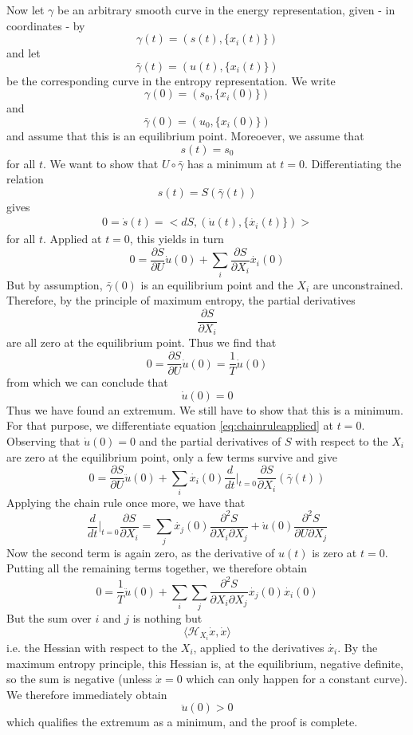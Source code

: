 \documentclass[a4paper, draft]{report}
\numberwithin{section}{chapter}
\numberwithin{equation}{chapter}
\theoremstyle{own}
\theoremstyle{remark}
\begin{document}
Now let $\gamma$ be an arbitrary smooth curve in the energy representation, given - in coordinates - by
$$
\gamma(t) = (s(t), \{ x_i(t) \})
$$
and let 
$$
\bar{\gamma}(t) = (u(t), \{ x_i(t) \})
$$
be the corresponding curve in the entropy representation. We write
$$
\gamma(0) = (s_0,\{ x_i(0) \} )
$$
and
$$
\bar{\gamma}(0) = (u_0, \{ x_i(0) \})
$$
and assume that this is an equilibrium point. Moreoever, we assume that
$$
s(t) = s_0
$$
for all $t$. We want to show that $U \circ \bar{\gamma}$ has a minimum at $t  = 0$. Differentiating the relation
$$
s(t) = S(\bar{\gamma}(t))
$$
gives 
\begin{align}
\label{eq:chainruleapplied}
0 = \dot{s}(t) = <dS, (\dot{u}(t), \{ \dot{x_i}(t)\})>
\end{align}
for all $t$. Applied at $t = 0$, this yields in turn
$$
0 = \frac{\partial S}{\partial U} \dot{u}(0) + 
\sum_i \frac{\partial S}{\partial X_i} \dot{x_i}(0)
$$
But by assumption, $\bar{\gamma}(0)$ is an equilibrium point and the $X_i$ are unconstrained. Therefore, by the principle of maximum entropy, the partial derivatives
$$
\frac{\partial S}{\partial X_i}
$$
are all zero at the equilibrium point. Thus we find that
$$
0 = \frac{\partial S}{\partial U} \dot{u}(0) = \frac{1}{T} \dot{u}(0)
$$
from which we can conclude that 
$$
\dot{u}(0) = 0
$$
Thus we have found an extremum. We still have to show that this is a minimum. For that purpose, we differentiate equation \eqref{eq:chainruleapplied} at $t = 0$. Observing that $\dot{u}(0) = 0$ and the partial derivatives of $S$ with respect to the $X_i$ are zero at the equilibrium point, only a few terms survive and give
$$
0 = \frac{\partial S}{\partial U} \ddot{u}(0) + \sum_i \dot{x_i}(0) 
\frac{d}{dt} |_{t=0} \frac{\partial S}{\partial X_i} (\bar{\gamma}(t))
$$
Applying the chain rule once more, we have that
$$
\frac{d}{dt} |_{t=0} \frac{\partial S}{\partial X_i} =
\sum_j \dot{x_j}(0) \frac{\partial^2 S}{\partial X_i \partial X_j}
+ 
\dot{u}(0) \frac{\partial^2 S}{\partial U \partial X_j} 
$$
Now the second term is again zero, as the derivative of $u(t)$ is zero at $t = 0$. Putting all the remaining terms together, we therefore obtain
$$
0 = \frac{1}{T}  \ddot{u}(0) + 
\sum_i \sum_j \frac{\partial^2 S}{\partial X_i \partial X_j} \dot{x_j}(0)  \dot{x_i}(0) 
$$
But the sum over $i$ and $j$ is nothing but
$$
\langle {\mathcal H}_{X_i} \dot{x}, \dot{x} \rangle 
$$
i.e. the Hessian with respect to the $X_i$, applied to the derivatives $\dot{x_i}$. By the maximum entropy principle, this Hessian is, at the equilibrium, negative definite, so the sum is negative (unless $\dot{x}= 0$ which can only happen for a constant curve). We therefore immediately obtain
$$
\ddot{u}(0) > 0
$$
which qualifies the extremum as a minimum, and the proof is complete.
\end{document}
